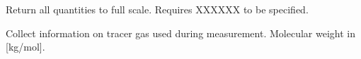 \documentclass[letterpaper,10pt,english]{sphinxmanual}
\begin{document}
\begin{fulllineitems}
\begin{fulllineitems}
\end{fulllineitems}


\begin{fulllineitems}
\label{\detokenize{index:windtunnel.PointConcentration.to_full_scale}}
Return all quantities to full scale. Requires XXXXXX to be
specified.

\end{fulllineitems}


\begin{fulllineitems}
\label{\detokenize{index:windtunnel.PointConcentration.tracer_information}}
Collect information on tracer gas used during measurement.
Molecular weight in {[}kg/mol{]}.

\end{fulllineitems}


\end{fulllineitems}

\end{document}
